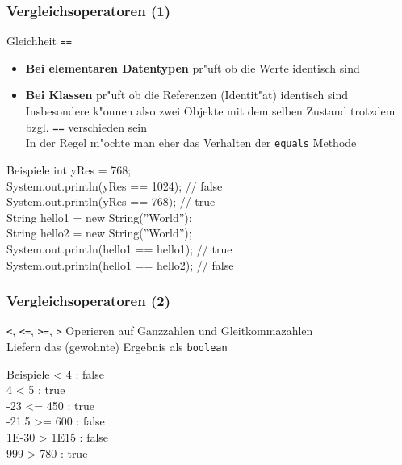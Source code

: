 \documentclass{beamer}
\begin{document}
\begin{frame}
\frametitle{Vergleichsoperatoren (1)}
\begin{block}{Gleichheit \texttt{==}}
\begin{itemize}
\item \textbf{Bei elementaren Datentypen} pr"uft ob die Werte identisch sind
\item \textbf{Bei Klassen} pr"uft ob \alert{die Referenzen} (Identit"at) identisch sind\\
Insbesondere k"onnen also zwei Objekte mit dem selben Zustand trotzdem bzgl. \texttt{==} verschieden sein\\
In der Regel m"ochte man eher das Verhalten der \texttt{equals} Methode
\end{itemize}
\end{block}

\pause

\begin{block}{Beispiele}
\ttfamily
int yRes = 768;\\
System.out.println(yRes == 1024); // false\\
System.out.println(yRes == 768); // true\\[0.5em]
String hello1 = new String(\textrm{''}World\textrm{''}):\\
String hello2 = new String(\textrm{''}World\textrm{''});\\
System.out.println(hello1 == hello1); // true\\
System.out.println(hello1 == hello2); // false
\end{block}
\end{frame}


\begin{frame}
\frametitle{Vergleichsoperatoren (2)}
\begin{block}{\texttt{<}, \texttt{<=}, \texttt{>=}, \texttt{>}}
Operieren auf Ganzzahlen und Gleitkommazahlen\\
Liefern das (gewohnte) Ergebnis als \texttt{boolean}
\end{block}

\pause

\begin{block}{Beispiele}
 < 4 : \pause false\\
4 < 5 : \pause true\\
-23 <= 450 : \pause true\\
-21.5 >= 600 : \pause false\\
1E-30 > 1E15 : \pause false\\
999 > 780 : \pause true
\end{block}
\end{frame}
\end{document}
